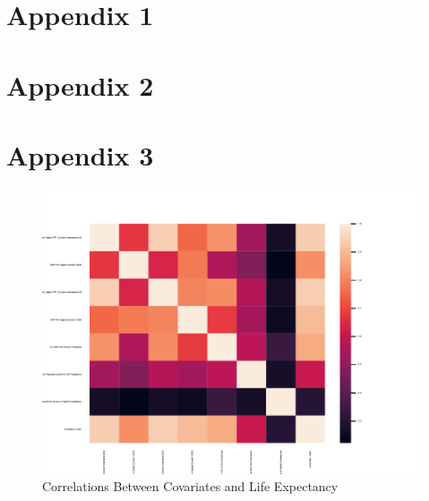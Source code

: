 \documentclass[10pt]{article}
\begin{document}
    \clearpage \newpage

    
    

    \clearpage \newpage

    \appendix

    \section*{Appendix 1}

        
        
        
        
    \section*{Appendix 2}


         
        
        


    \section*{Appendix 3}

        \begin{figure}[h!]
            \centering
            \caption{Correlations Between Covariates and Life Expectancy}
            \label{LE_Health_Econ_Correlations}	
            \includegraphics[width=\linewidth,keepaspectratio=true]{../Output/Figures/LE_Health_Econ_Correlations_combined_short.pdf}
        \end{figure}
\end{document}
